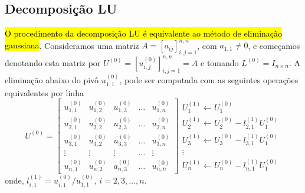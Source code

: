 \subsection{Decomposição LU}

\hl{O procedimento da decomposição LU é equivalente ao método de eliminação gaussiana}. Consideramos uma matriz $A = [a_{ij}]_{i,j=1}^{n,n}$, com $a_{1,1}\neq 0$, e começamos denotando esta matriz por $U^{(0)} = [u_{i,j}^{(0)}]_{i,j=1}^{n,n} = A$ e tomando $L^{(0)} = I_{n\times n}$. A eliminação abaixo do pivô $u_{1,1}^{(0)}$, pode ser computada com as seguintes operações equivalentes por linha
\begin{equation}
  U^{(0)} = \begin{bmatrix}
    u_{1,1}^{(0)} & u_{1,2}^{(0)} & u_{1,3}^{(0)} & \ldots & u_{1,n}^{(0)} \\
    u_{2,1}^{(0)} & u_{2,2}^{(0)} & u_{2,3}^{(0)} & \ldots & u_{2,n}^{(0)} \\
    u_{3,1}^{(0)} & u_{3,2}^{(0)} & u_{3,3}^{(0)} & \ldots & u_{3,n}^{(0)} \\
    \vdots & \vdots & \vdots & \ldots & \vdots \\
    u_{n,1}^{(0)} & u_{n,2}^{(0)} & a_{n,3}^{(0)} & \ldots & u_{n,n}^{(0)}
  \end{bmatrix}
  \begin{array}{l}
    U_1^{(1)} \leftarrow U_1^{(0)}\\
    U_2^{(1)} \leftarrow U_2^{(0)} - l_{2,1}^{(1)}U_1^{(0)}\\
    U_3^{(1)} \leftarrow U_3^{(0)} - l_{3,1}^{(1)}U_1^{(0)}\\
    \vdots\\
    U_n^{(1)} \leftarrow U_n^{(0)} - l_{n,1}^{(1)}U_1^{(0)}
  \end{array}
\end{equation}
onde, $l_{i,1}^{(1)}=u_{i,1}^{(0)}/u_{1,1}^{(0)}$, $i=2, 3, \dotsc, n$.

